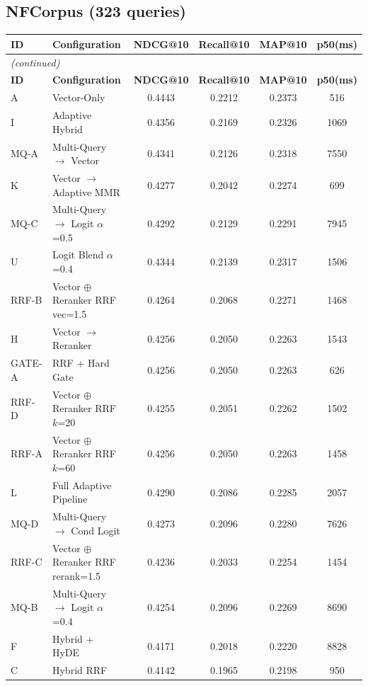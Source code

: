 \documentclass[11pt]{article}
\begin{document}
\subsection{NFCorpus (323 queries)}

\begin{longtable}{llcccc}
\toprule
\textbf{ID} & \textbf{Configuration} & \textbf{NDCG@10} & \textbf{Recall@10} & \textbf{MAP@10} & \textbf{p50(ms)} \\
\midrule
\endfirsthead
\multicolumn{6}{l}{\emph{(continued)}} \\
\toprule
\textbf{ID} & \textbf{Configuration} & \textbf{NDCG@10} & \textbf{Recall@10} & \textbf{MAP@10} & \textbf{p50(ms)} \\
\midrule
\endhead
\bottomrule
\endlastfoot
A & Vector-Only & 0.4443 & 0.2212 & 0.2373 & 516 \\
I & Adaptive Hybrid & 0.4356 & 0.2169 & 0.2326 & 1069 \\
MQ-A & Multi-Query $\to$ Vector & 0.4341 & 0.2126 & 0.2318 & 7550 \\
K & Vector $\to$ Adaptive MMR & 0.4277 & 0.2042 & 0.2274 & 699 \\
MQ-C & Multi-Query $\to$ Logit $\alpha$=0.5 & 0.4292 & 0.2129 & 0.2291 & 7945 \\
U & Logit Blend $\alpha$=0.4 & 0.4344 & 0.2139 & 0.2317 & 1506 \\
RRF-B & Vector $\oplus$ Reranker RRF vec=1.5 & 0.4264 & 0.2068 & 0.2271 & 1468 \\
H & Vector $\to$ Reranker & 0.4256 & 0.2050 & 0.2263 & 1543 \\
GATE-A & RRF + Hard Gate & 0.4256 & 0.2050 & 0.2263 & 626 \\
RRF-D & Vector $\oplus$ Reranker RRF $k$=20 & 0.4255 & 0.2051 & 0.2262 & 1502 \\
RRF-A & Vector $\oplus$ Reranker RRF $k$=60 & 0.4256 & 0.2050 & 0.2263 & 1458 \\
L & Full Adaptive Pipeline & 0.4290 & 0.2086 & 0.2285 & 2057 \\
MQ-D & Multi-Query $\to$ Cond Logit & 0.4273 & 0.2096 & 0.2280 & 7626 \\
RRF-C & Vector $\oplus$ Reranker RRF rerank=1.5 & 0.4236 & 0.2033 & 0.2254 & 1454 \\
MQ-B & Multi-Query $\to$ Logit $\alpha$=0.4 & 0.4254 & 0.2096 & 0.2269 & 8690 \\
F & Hybrid + HyDE & 0.4171 & 0.2018 & 0.2220 & 8828 \\
C & Hybrid RRF & 0.4142 & 0.1965 & 0.2198 & 950 \\

\end{longtable}
\end{document}

